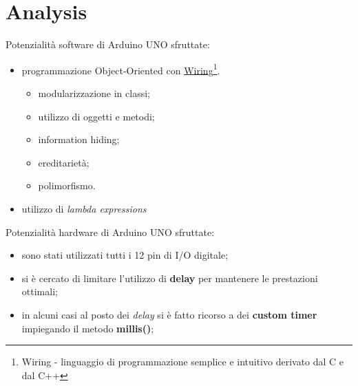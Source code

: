 \section{Analysis}
Potenzialità software di Arduino UNO sfruttate:
\begin{itemize}
	\item programmazione Object-Oriented con \href{https://it.wikipedia.org/wiki/Wiring}{Wiring\footnote{Wiring - linguaggio di programmazione semplice e intuitivo derivato dal C e dal C++}}.
	\begin{itemize}
		\item modularizzazione in classi;
		\item utilizzo di oggetti e metodi;
		\item information hiding;
		\item ereditarietà;
		\item polimorfismo.
	\end{itemize}
	\item utilizzo di \textit{lambda expressions}
\end{itemize}
Potenzialità hardware di Arduino UNO sfruttate:
\begin{itemize}
	\item sono stati utilizzati tutti i 12 pin di I/O digitale;
	\item si è cercato di limitare l'utilizzo di \textbf{delay} per mantenere le prestazioni ottimali;
	\item in alcuni casi al posto dei \textit{delay} si è fatto ricorso a dei \textbf{custom timer} impiegando il metodo \textbf{millis()};
\end{itemize}